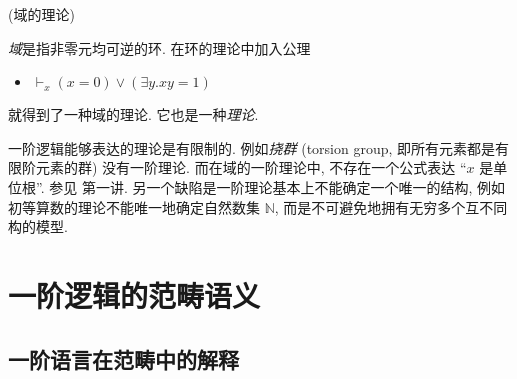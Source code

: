 
\begin{example}
	{(域的理论)}
	
	\emph{域}是指非零元均可逆的环. 在环的理论中加入公理
	\begin{itemize}
		\item $\vdash_x (x=0) \lor (\exists y. xy=1)$
	\end{itemize}
	就得到了一种域的理论\footnotemark. 它也是一种\emph{\coherent{}理论}.
\end{example}



\begin{remark}
	{}
	一阶逻辑能够表达的理论是有限制的. 例如\emph{挠群} (torsion group, 即所有元素都是有限阶元素的群) 没有一阶理论. 而在域的一阶理论中, 不存在一个公式表达 ``$x$ 是单位根''. 参见 \cite{Lurie-Categorical-Logic} 第一讲.
	另一个缺陷是一阶理论基本上不能确定一个唯一的结构, 例如初等算数的理论不能唯一地确定自然数集 $\mathbb{N}$, 而是不可避免地拥有无穷多个互不同构的模型.
\end{remark}

\section{一阶逻辑的范畴语义}

\subsection{一阶语言在范畴中的解释}

